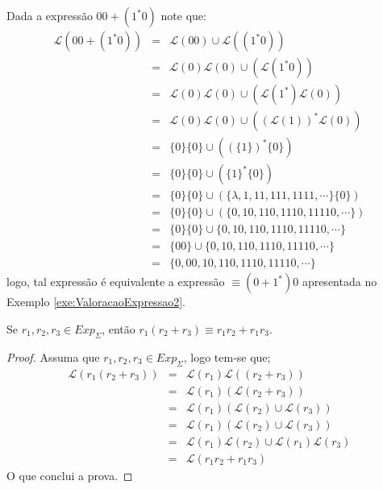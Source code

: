 \begin{example}
	Dada a expressão $00 + (1^*0)$ note que:
	\begin{eqnarray*}
		\mathcal{L}(00 + (1^*0)) & = &\mathcal{L}(00) \cup \mathcal{L}((1^*0))\\
		& = & \mathcal{L}(0)\mathcal{L}(0) \cup (\mathcal{L}(1^*0))\\
		& = & \mathcal{L}(0)\mathcal{L}(0) \cup (\mathcal{L}(1^*)\mathcal{L}(0))\\
		& = & \mathcal{L}(0)\mathcal{L}(0) \cup ((\mathcal{L}(1))^*\mathcal{L}(0))\\
		& = & \{0\}\{0\} \cup ((\{1\})^*\{0\})\\
		& = & \{0\}\{0\} \cup (\{1\}^*\{0\})\\
		& = & \{0\}\{0\} \cup (\{\lambda, 1, 11, 111, 1111, \cdots\}\{0\})\\
		& = & \{0\}\{0\} \cup (\{0, 10, 110, 1110, 11110, \cdots\})\\
		& = & \{0\}\{0\} \cup \{0, 10, 110, 1110, 11110, \cdots\}\\
		& = & \{00\} \cup \{0, 10, 110, 1110, 11110, \cdots\}\\
		& = & \{0, 00, 10, 110, 1110, 11110, \cdots\}
	\end{eqnarray*}
	logo, tal expressão é equivalente a expressão  $\equiv (0 + 1^*)0$ apresentada no Exemplo \ref{exe:ValoracaoExpressao2}. 
\end{example}

\begin{proposition}
	Se $r_1, r_2, r_3 \in Exp_\Sigma$, então $r_1 (r_2 + r_3) \equiv r_1r_2 + r_1r_3$.
\end{proposition}

\begin{proof}
	Assuma que $r_1, r_2, r_3 \in Exp_\Sigma$, logo tem-se que;
	\begin{eqnarray*}
		\mathcal{L}(r_1 (r_2 + r_3)) & = & \mathcal{L}(r_1)\mathcal{L}((r_2 + r_3))\\
		& = & \mathcal{L}(r_1)(\mathcal{L}(r_2 + r_3))\\
		& = & \mathcal{L}(r_1)(\mathcal{L}(r_2) \cup  \mathcal{L}(r_3))\\ 
		& = & \mathcal{L}(r_1)(\mathcal{L}(r_2) \cup  \mathcal{L}(r_3))\\ 
		& = & \mathcal{L}(r_1)\mathcal{L}(r_2) \cup  \mathcal{L}(r_1)\mathcal{L}(r_3)\\ 
		& = & \mathcal{L}(r_1r_2 + r_1r_3)
	\end{eqnarray*}
	O que conclui a prova.
\end{proof}

